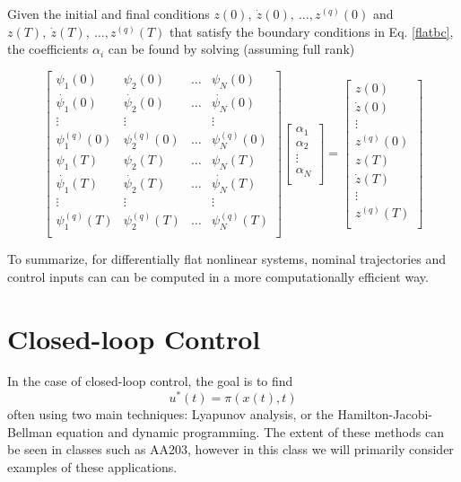 \documentclass[twoside]{article}
\begin{document}
Given the initial and final conditions $z(0), \: \dot{z}(0), \: \dots , z^{(q)}(0)$ and $z(T), \: \dot{z}(T), \: \dots , z^{(q)}(T)$ that satisfy the boundary conditions in Eq. \ref{flatbc}, the coefficients $\alpha_i$ can be found by solving (assuming full rank)

\begin{equation}
\begin{bmatrix}
    \psi_1(0) & \psi_2(0) & \dots & \psi_N(0) \\
    \dot{\psi_1}(0) & \dot{\psi_2}(0) & \dots & \dot{\psi_N}(0) \\
    \vdots & \vdots & & \vdots \\
    \psi_1^{(q)}(0) & \psi_2^{(q)}(0) & \dots & \psi_N^{(q)}(0) \\
    \psi_1(T) & \psi_2(T) & \dots & \psi_N(T) \\
    \dot{\psi_1}(T) & \dot{\psi_2}(T) & \dots & \dot{\psi_N}(T) \\
    \vdots & \vdots & & \vdots \\
    \psi_1^{(q)}(T) & \psi_2^{(q)}(T) & \dots & \psi_N^{(q)}(T) \\
\end{bmatrix}
\begin{bmatrix}
    \alpha_1 \\
    \alpha_2 \\
    \vdots \\
    \alpha_N \\
\end{bmatrix} =
\begin{bmatrix}
    z(0) \\
    \dot{z}(0) \\
    \vdots \\
    z^{(q)}(0) \\
    z(T) \\
    \dot{z}(T) \\
    \vdots \\
    z^{(q)}(T) \\
\end{bmatrix}
\end{equation}

To summarize, for differentially flat nonlinear systems, nominal trajectories and control inputs can can be computed in a more computationally efficient way.

\section{Closed-loop Control}
In the case of closed-loop control, the goal is to find
\begin{equation}
u^*(t)=\pi(x(t),t)
\end{equation}
often using two main techniques: Lyapunov analysis, or the Hamilton-Jacobi-Bellman equation and dynamic programming. The extent of these methods can be seen in classes such as AA203, however in this class we will primarily consider examples of these applications.
\end{document}
